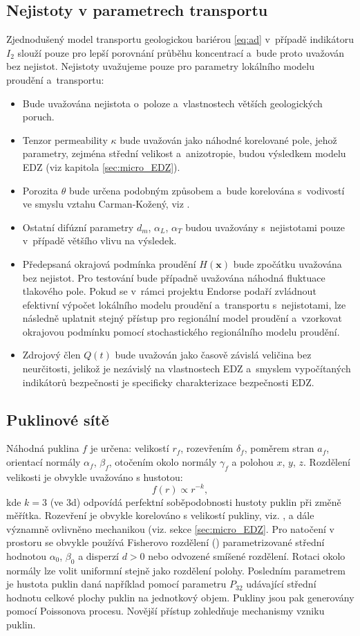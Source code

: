\documentclass{article}
\def\vc#1{\mathbf{\boldsymbol{#1}}}     %
\begin{document}
\subsection{Nejistoty v parametrech transportu}
\label{sec:nejistoty}
Zjednodušený model transportu geologickou bariérou \eqref{eq:ad} v~případě indikátoru $I_2$ slouží pouze pro lepší porovnání průběhu koncentrací a~bude proto uvažován bez nejistot. Nejistoty uvažujeme pouze pro parametry lokálního modelu proudění a~transportu:
\begin{itemize}
 \item Bude uvažována nejistota o~poloze a~vlastnostech větších geologických poruch.
 \item Tenzor permeability $\kappa$ bude uvažován jako náhodné korelované pole, jehož parametry, zejména střední velikost a~anizotropie, budou 
 výsledkem modelu EDZ (viz kapitola \ref{sec:micro_EDZ}).
 \item Porozita $\theta$ bude určena podobným způsobem a~bude korelována s~vodivostí ve smyslu vztahu Carman-Kožený, viz \cite{Carrier2003}.
 \item Ostatní difúzní parametry $d_m$, $\alpha_L$, $\alpha_T$ budou uvažovány s~nejistotami pouze v~případě většího vlivu na výsledek.
 \item Předepsaná okrajová podmínka proudění $H(\vc x)$ bude zpočátku uvažována bez nejistot. Pro testování bude případně uvažována náhodná fluktuace tlakového pole. Pokud se v~rámci projektu Endorse podaří zvládnout efektivní výpočet lokálního modelu proudění a~transportu s~nejistotami, lze následně uplatnit stejný přístup pro regionální model proudění a~vzorkovat okrajovou podmínku pomocí stochastického regionálního modelu proudění.
 \item Zdrojový člen $Q(t)$ bude uvažován jako časově závislá veličina bez neurčitosti, jelikož 
 je nezávislý na vlastnostech EDZ a~smyslem vypočítaných indikátorů bezpečnosti je specificky charakterizace bezpečnosti EDZ.
\end{itemize}

\subsection{Puklinové sítě}
\label{sec:dfn}
Náhodná puklina $f$ je určena: velikostí $r_f$, rozevřením $\delta_f$, poměrem stran $a_f$, orientací normály $\alpha_f$, $\beta_f$, otočením okolo normály $\gamma_f$ a polohou $x$, $y$, $z$. Rozdělení velikosti je obvykle uvažováno s hustotou:
\[
   f(r) \propto r^{-k},
\]
kde $k = 3$ (ve 3d) odpovídá perfektní soběpodobnosti hustoty puklin při změně měřítka. Rozevření je obvykle korelováno s velikostí pukliny, viz. \cite{Olson2003},
a dále významně ovlivněno mechanikou (viz. sekce \ref{sec:micro_EDZ}. Pro natočení v prostoru se obvykle používá Fisherovo rozdělení (\cite{Fisher1993}) parametrizované střední hodnotou $\alpha_0$, $\beta_0$ a disperzí $d>0$ nebo odvozené smíšené rozdělení. 
Rotaci okolo normály lze volit uniformní stejně jako rozdělení polohy. Posledním parametrem je hustota puklin daná například pomocí parametru  $P_{32}$
udávající střední hodnotu celkové plochy puklin na jednotkový objem. Pukliny jsou pak generovány pomocí Poissonova procesu. Novější přístup
 \cite{Maillot2014} zohledňuje mechanismy vzniku puklin.
\end{document}
